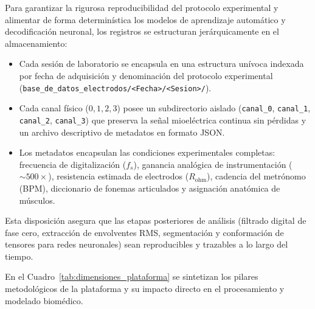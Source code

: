 Para garantizar la rigurosa reproducibilidad del protocolo experimental y alimentar de forma determinística los modelos de aprendizaje automático y decodificación neuronal, los registros se estructuran jerárquicamente en el almacenamiento:
\begin{itemize}
    \item Cada sesión de laboratorio se encapsula en una estructura unívoca indexada por fecha de adquisición y denominación del protocolo experimental (\nolinkurl{base_de_datos_electrodos/<Fecha>/<Sesion>/}).
    \item Cada canal físico ($0, 1, 2, 3$) posee un subdirectorio aislado (\texttt{canal\_0}, \texttt{canal\_1}, \texttt{canal\_2}, \texttt{canal\_3}) que preserva la señal mioeléctrica continua sin pérdidas y un archivo descriptivo de metadatos en formato JSON.
    \item Los metadatos encapsulan las condiciones experimentales completas: frecuencia de digitalización ($f_s$), ganancia analógica de instrumentación ($\sim 500\times$), resistencia estimada de electrodos ($R_{\text{ohm}}$), cadencia del metrónomo (BPM), diccionario de fonemas articulados y asignación anatómica de músculos.
\end{itemize}
Esta disposición asegura que las etapas posteriores de análisis (filtrado digital de fase cero, extracción de envolventes RMS, segmentación y conformación de tensores para redes neuronales) sean reproducibles y trazables a lo largo del tiempo.

En el Cuadro~\ref{tab:dimensiones_plataforma} se sintetizan los pilares metodológicos de la plataforma y su impacto directo en el procesamiento y modelado biomédico.

